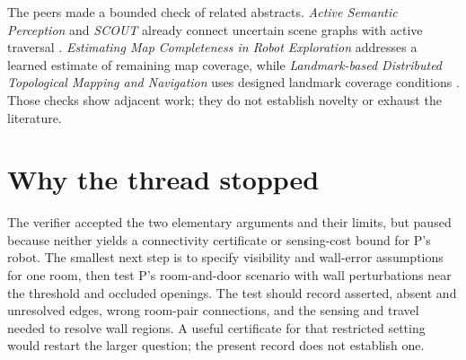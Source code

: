 \documentclass{article}
\begin{document}
The peers made a bounded check of related abstracts. \emph{Active Semantic Perception} and \emph{SCOUT}
already connect uncertain scene graphs with active traversal \cite{active-semantic-perception,scout}.
\emph{Estimating Map Completeness in Robot Exploration} addresses a learned estimate of remaining map
coverage, while \emph{Landmark-based Distributed Topological Mapping and Navigation} uses designed landmark
coverage conditions \cite{map-completeness,landmark-mapping}. Those checks show adjacent work; they do not
establish novelty or exhaust the literature.

\section{Why the thread stopped}

The verifier accepted the two elementary arguments and their limits, but paused because neither yields a
connectivity certificate or sensing-cost bound for P's robot. The smallest next step is to specify visibility
and wall-error assumptions for one room, then test P's room-and-door scenario with wall perturbations near the
threshold and occluded openings. The test should record asserted, absent and unresolved edges, wrong room-pair
connections, and the sensing and travel needed to resolve wall regions. A useful certificate for that
restricted setting would restart the larger question; the present record does not establish one.



\end{document}
